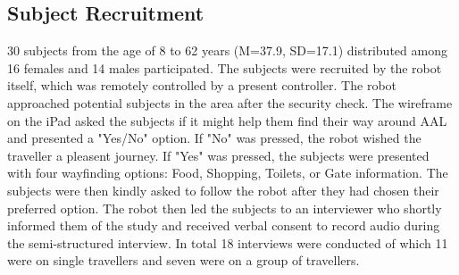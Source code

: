 \subsection{Subject Recruitment}
30 subjects from the age of 8 to 62 years (M=37.9, SD=17.1) distributed among 16 females and 14 males participated. The subjects were recruited by the robot itself, which was remotely controlled by a present controller. The robot approached potential subjects in the area after the security check. The wireframe on the iPad asked the subjects if it might help them find their way around AAL and presented a "Yes/No" option. If "No" was pressed, the robot wished the traveller a pleasent journey. If "Yes" was pressed, the subjects were presented with four wayfinding options: Food, Shopping, Toilets, or Gate information. The subjects were then kindly asked to follow the robot after they had chosen their preferred option. The robot then led the subjects to an interviewer who shortly informed them of the study and received verbal consent to record audio during the semi-structured interview. In total 18 interviews were conducted of which 11 were on single travellers and seven were on a group of travellers.
%
